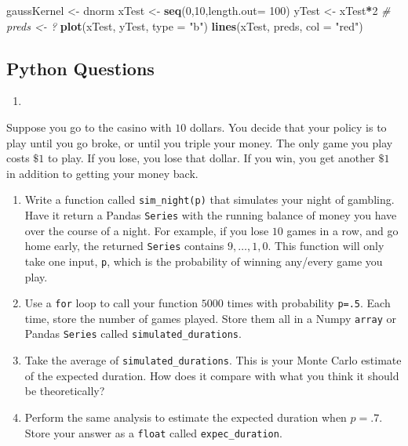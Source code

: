 \documentclass[12pt,krantz2]{krantz}
\makeatletter
\newenvironment{Shaded}{\begin{snugshade}}{\end{snugshade}}
\newcommand{\CommentTok}[1]{\textcolor[rgb]{0.37,0.37,0.37}{\textit{#1}}}
\newcommand{\DataTypeTok}[1]{\textcolor[rgb]{0.27,0.27,0.27}{#1}}
\newcommand{\DecValTok}[1]{\textcolor[rgb]{0.06,0.06,0.06}{#1}}
\newcommand{\KeywordTok}[1]{\textcolor[rgb]{0.27,0.27,0.27}{\textbf{#1}}}
\newcommand{\NormalTok}[1]{#1}
\newcommand{\OperatorTok}[1]{\textcolor[rgb]{0.43,0.43,0.43}{\textbf{#1}}}
\newcommand{\StringTok}[1]{\textcolor[rgb]{0.5,0.5,0.5}{#1}}
\providecommand{\tightlist}{%
  \setlength{\itemsep}{0pt}\setlength{\parskip}{0pt}}
\newenvironment{kframe}{%
\medskip{}
\setlength{\fboxsep}{.8em}
 \def\at@end@of@kframe{}%
 \ifinner\ifhmode%
  \def\at@end@of@kframe{\end{minipage}}%
  \begin{minipage}{\columnwidth}%
 \fi\fi%
 \def\FrameCommand##1{\hskip\@totalleftmargin \hskip-\fboxsep
 \colorbox{shadecolor}{##1}\hskip-\fboxsep
     \hskip-\linewidth \hskip-\@totalleftmargin \hskip\columnwidth}%
 \MakeFramed {\advance\hsize-\width
   \@totalleftmargin\z@ \linewidth\hsize
   \@setminipage}}%
 {\par\unskip\endMakeFramed%
 \at@end@of@kframe}
\renewenvironment{Shaded}{\begin{kframe}}{\end{kframe}}
\makeatother
\begin{document}
\begin{Shaded}
\begin{Highlighting}[]
\NormalTok{gaussKernel <-}\StringTok{ }\NormalTok{dnorm}
\NormalTok{xTest <-}\StringTok{ }\KeywordTok{seq}\NormalTok{(}\DecValTok{0}\NormalTok{,}\DecValTok{10}\NormalTok{,}\DataTypeTok{length.out=} \DecValTok{100}\NormalTok{)}
\NormalTok{yTest <-}\StringTok{ }\NormalTok{xTest}\OperatorTok{*}\DecValTok{2} 
\CommentTok{# preds <- ?}
\KeywordTok{plot}\NormalTok{(xTest, yTest, }\DataTypeTok{type =} \StringTok{"b"}\NormalTok{)}
\KeywordTok{lines}\NormalTok{(xTest, preds, }\DataTypeTok{col =} \StringTok{"red"}\NormalTok{)}
\end{Highlighting}
\end{Shaded}

\hypertarget{python-questions-8}{%
\subsection{Python Questions}\label{python-questions-8}}

\begin{enumerate}
\def\labelenumi{\arabic{enumi}.}
\item
\end{enumerate}

Suppose you go to the casino with \(10\) dollars. You decide that your policy is to play until you go broke, or until you triple your money. The only game you play costs \(\$1\) to play. If you lose, you lose that dollar. If you win, you get another \(\$1\) in addition to getting your money back.

\begin{enumerate}
\def\labelenumi{\alph{enumi})}
\tightlist
\item
  Write a function called \texttt{sim\_night(p)} that simulates your night of gambling. Have it return a Pandas \texttt{Series} with the running balance of money you have over the course of a night. For example, if you lose \(10\) games in a row, and go home early, the returned \texttt{Series} contains \(9, \ldots, 1,0\). This function will only take one input, \texttt{p}, which is the probability of winning any/every game you play.
\item
  Use a \texttt{for} loop to call your function \(5000\) times with probability \texttt{p=.5}. Each time, store the number of games played. Store them all in a Numpy \texttt{array} or Pandas \texttt{Series} called \texttt{simulated\_durations}.
\item
  Take the average of \texttt{simulated\_durations}. This is your Monte Carlo estimate of the expected duration. How does it compare with what you think it should be theoretically?
\item
  Perform the same analysis to estimate the expected duration when \(p=.7\). Store your answer as a \texttt{float} called \texttt{expec\_duration}.
\end{enumerate}
\end{document}
